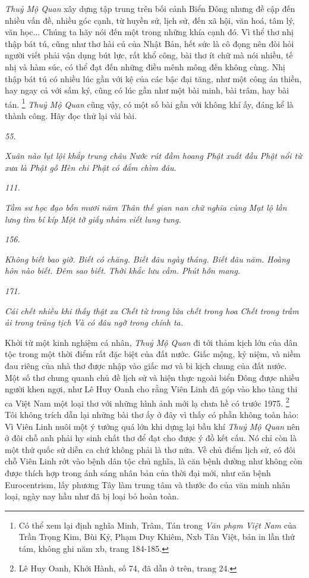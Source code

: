 \documentclass[../main.tex]{subfiles}
\begin{document}
\begin{multicols}{2}
\textit{Thuỷ Mộ Quan} xây dựng tập trung trên bối cảnh Biển Đông nhưng đề cập đến nhiều vấn đề, nhiều góc cạnh, từ huyền sử, lịch sử, đến xã hội, văn hoá, tâm lý, văn học... Chúng ta hãy nói đến một trong những khía cạnh đó. Vì thể thơ nhị thập bát tú, cũng như thơ hài cú của Nhật Bản, hết sức là cô đọng nên đòi hỏi người viết phải vận dụng bút lực, rất khổ công, bài thơ ít chữ mà nói nhiều, tế nhị và hàm súc, có thể đạt đến những điều mênh mông đến không cùng. Nhị thập bát tú có nhiều lúc gần với kệ của các bậc đại tăng, như một công án thiền, hay ngay cả với sấm ký, cũng có lúc gần như một bài minh, bài trâm, hay bài tán. \footnote{
Có thể xem lại định nghĩa Minh, Trâm, Tán trong \textit{Văn phạm Việt Nam} của Trần Trọng Kim, Bùi Kỷ, Phạm Duy Khiêm, Nxb Tân Việt, bản in lần thứ tám, không ghi năm xb, trang 184-185.} \textit{Thuỷ Mộ Quan }cũng vậy, có một số bài gần với không khí ấy, đáng kể là thành công. Hãy đọc thử lại vài bài. 

\textit{55.} 

\textit{Xuân nào lụt lội khắp trung châu} 
\textit{Nước rút đầm hoang Phật xuất đầu} 
\textit{Phật nổi từ xưa là Phật gỗ} 
\textit{Hèn chi Phật có đắm chìm đâu.} 

\textit{111.} 

\textit{Tầm sư học đạo bốn mươi năm} 
\textit{Thân thế gian nan chữ nghĩa cùng} 
\textit{Mạt lộ lần lưng tìm bí kíp} 
\textit{Một tờ giấy nhảm viết lung tung.} 

\textit{156.} 

\textit{Không biết bao giờ. Biết có chăng.} 
\textit{Biết đâu ngày tháng. Biết đâu năm.} 
\textit{Hoàng hôn nào biết. Đêm sao biết.} 
\textit{Thời khắc lưu cầm. Phút hỗn mang.} 

\textit{171.} 

\textit{Cái chết nhiều khi thấy thật xa} 
\textit{Chết từ trong lửa chết trong hoa} 
\textit{Chết trong trầm ải trong trăng tịch} 
\textit{Và có đâu ngờ trong chính ta.} 

Khởi từ một kinh nghiệm cá nhân, \textit{Thuỷ Mộ Quan} đi tới thảm kịch lớn của dân tộc trong một thời điểm rất đặc biệt của đất nước. Giấc mộng, kỷ niệm, và niềm đau riêng của nhà thơ được nhập vào giấc mơ và bi kịch chung của đất nước. Một số thơ chung quanh chủ đề lịch sử và hiện thực ngoài biển Đông được nhiều người khen ngợi, như Lê Huy Oanh cho rằng Viên Linh đã góp vào kho tàng thi ca Việt Nam một loại thơ với những hình ảnh mới lạ chưa hề có trước 1975. \footnote{
Lê Huy Oanh, Khởi Hành, số 74, đã dẫn ở trên, trang 24.} Tôi không trích dẫn lại những bài thơ ấy ở đây vì thấy có phần không toàn hảo: Vì Viên Linh nuôi một ý tưởng quá lớn khi dựng lại bầu khí \textit{Thuỷ Mộ Quan} nên ở đôi chỗ anh phải hy sinh chất thơ để đạt cho được ý đồ kết cấu. Nó chỉ còn là một thứ quốc sử diễn ca chứ không phải là thơ nữa. Về chủ điểm lịch sử, có đôi chỗ Viên Linh rớt vào bệnh dân tộc chủ nghĩa, là căn bệnh dường như không còn được thích hợp trong ánh sáng nhân bản của thời đại mới, như căn bệnh Eurocentrism, lấy phương Tây làm trung tâm và thước đo của văn minh nhân loại, ngày nay hầu như đã bị loại bỏ hoàn toàn. 


\end{multicols}
\end{document}
